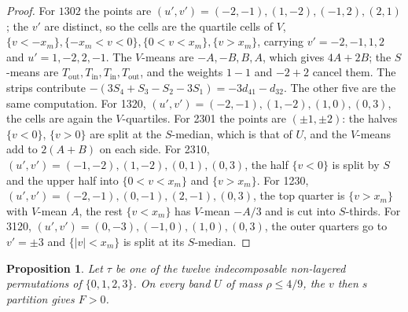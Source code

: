 \documentclass[11pt]{amsart}
\newtheorem{proposition}[theorem]{Proposition}
\theoremstyle{definition}
\theoremstyle{remark}
\numberwithin{equation}{section}
\begin{document}
\begin{proof}
For $1302$ the points are $(u',v')=(-2,-1),(1,-2),(-1,2),(2,1)$; the $v'$ are distinct, so the cells are the quartile
cells of $V$, $\{v<-x_m\},\{-x_m<v<0\},\{0<v<x_m\},\{v>x_m\}$, carrying $v'=-2,-1,1,2$ and $u'=1,-2,2,-1$. The $V$-means are
$-A,-B,B,A$, which gives $4A+2B$; the $S$-means are $T_{\mathrm{out}},T_{\mathrm{in}},T_{\mathrm{in}},T_{\mathrm{out}}$,
and the weights $1-1$ and $-2+2$ cancel them. The strips contribute $-(3S_4+S_3-S_2-3S_1)=-3d_{41}-d_{32}$. The other five are the same
computation. For 1320, $(u',v')=(-2,-1),(1,-2),(1,0),(0,3)$, the cells are again the $V$-quartiles. For 2301 the points
are $(\pm1,\pm2)$: the halves $\{v<0\}$, $\{v>0\}$ are split at the $S$-median, which is that of $U$, and the $V$-means
add to $2(A+B)$ on each side. For 2310, $(u',v')=(-1,-2),(1,-2),(0,1),(0,3)$, the half $\{v<0\}$ is split by $S$ and the
upper half into $\{0<v<x_m\}$ and $\{v>x_m\}$. For 1230, $(u',v')=(-2,-1),(0,-1),(2,-1),(0,3)$, the top quarter is
$\{v>x_m\}$ with $V$-mean $A$, the rest $\{v<x_m\}$ has $V$-mean $-A/3$ and is cut into $S$-thirds. For 3120,
$(u',v')=(0,-3),(-1,0),(1,0),(0,3)$, the outer quarters go to $v'=\pm3$ and $\{|v|<x_m\}$ is split at its $S$-median.
\end{proof}

\begin{proposition}\label{prop:r4}
Let $\tau$ be one of the twelve indecomposable non-layered permutations of $\{0,1,2,3\}$. On every band $U$ of mass
$\rho\le4/9$, the $v$ then $s$ partition gives $F>0$.
\end{proposition}
\end{document}
